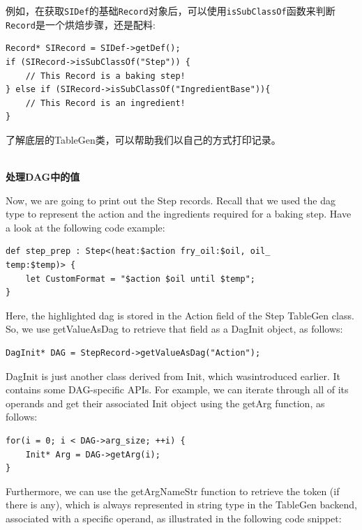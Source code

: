 例如，在获取\texttt{SIDef}的基础\texttt{Record}对象后，可以使用\texttt{isSubClassOf}函数来判断\texttt{Record}是一个烘焙步骤，还是配料:

\begin{lstlisting}[style=styleCXX]
Record* SIRecord = SIDef->getDef();
if (SIRecord->isSubClassOf("Step")) {
	// This Record is a baking step!
} else if (SIRecord->isSubClassOf("IngredientBase")){
	// This Record is an ingredient!
}
\end{lstlisting}

了解底层的TableGen类，可以帮助我们以自己的方式打印记录。

\hspace*{\fill} \\ %
\noindent
\textbf{处理DAG中的值}

Now, we are going to print out the Step records. Recall that we used the dag type to represent the action and the ingredients required for a baking step. Have a look at the following code example:

\begin{lstlisting}[style=styleCXX]
def step_prep : Step<(heat:$action fry_oil:$oil, oil_
temp:$temp)> {
	let CustomFormat = "$action $oil until $temp";
}
\end{lstlisting}

Here, the highlighted dag is stored in the Action field of the Step TableGen class. So, we use getValueAsDag to retrieve that field as a DagInit object, as follows:

\begin{lstlisting}[style=styleCXX]
DagInit* DAG = StepRecord->getValueAsDag("Action");
\end{lstlisting}

DagInit is just another class derived from Init, which wasintroduced earlier. It contains some DAG-specific APIs. For example, we can iterate through all of its operands and get their associated Init object using the getArg function, as follows:

\begin{lstlisting}[style=styleCXX]
for(i = 0; i < DAG->arg_size; ++i) {
	Init* Arg = DAG->getArg(i);
}
\end{lstlisting}

Furthermore, we can use the getArgNameStr function to retrieve the token (if there is any), which is always represented in string type in the TableGen backend, associated with a specific operand, as illustrated in the following code snippet:

